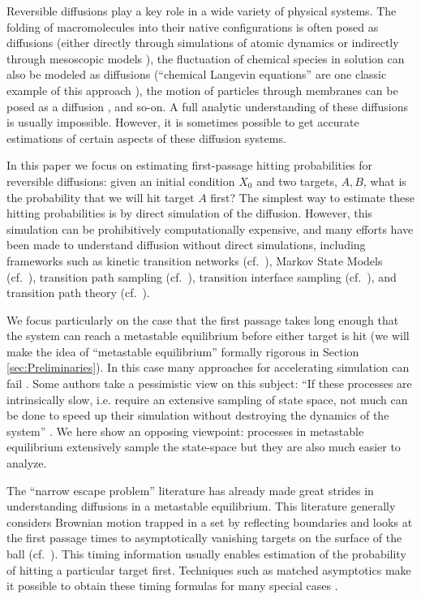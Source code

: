 \documentclass[12pt, nofootinbib,english, amsmath, amssymb, aps, priprint, graphicx,floatfix]{revtex4-1}
\theoremstyle{plain}
\theoremstyle{definition}
\theoremstyle{plain}
\begin{document}
Reversible diffusions play a key role in a wide variety of physical systems.  The folding of macromolecules into their native configurations is often posed as diffusions (either directly through simulations of atomic dynamics or indirectly through mesoscopic models \cite{Scheraga2007-qw,Hospital2015-ol,lei2010direct}), the fluctuation of chemical species in solution can also be modeled as diffusions (``chemical Langevin equations'' are one classic example of this approach \cite{sotiropoulos2011analytical,gillespie2000chemical}), the motion of particles through  membranes can be posed as a diffusion \cite{holcman2004escape}, and so-on.   A full analytic understanding of these diffusions is usually impossible.  However, it is sometimes possible to get accurate estimations of certain aspects of these diffusion systems.

In this paper we focus on estimating first-passage hitting probabilities for reversible diffusions: given an initial condition $X_0$ and two targets, $A,B$, what is the probability that we will hit target $A$ first?  The simplest way to estimate these hitting probabilities is by direct simulation of the diffusion.  However, this simulation can be prohibitively computationally expensive, and many efforts have been made to understand diffusion without direct simulations, including frameworks such as kinetic transition networks (cf.\ \cite{Noe2006-cs, Wales2006-ur}), Markov State Models (cf.\ \cite{Pande2010-yi, Chodera2014-bh, Husic2018-xp}), transition path sampling (cf.\ \cite{Dellago1998-lb, Bolhuis2002-ws}), transition interface sampling (cf.\ \cite{Van_Erp2005-vw}), and transition path theory (cf.\ \cite{E2006-fm, E2010-sr}).  

We focus particularly on the case that the first passage takes long enough that the system can reach a metastable equilibrium before either target is hit (we will make the idea of ``metastable equilibrium'' formally rigorous in Section \ref{sec:Preliminaries}).  In this case many approaches for accelerating simulation can fail \cite{Baum1986-we, Wille1987-tf, Machta2009-gh}. Some authors take a pessimistic view on this subject: ``If these processes are intrinsically slow, i.e. require an extensive sampling of state space, not much can be done to speed up their simulation without destroying the dynamics of the system'' \cite{Christen2008-ge}.  We here show an opposing viewpoint: processes in metastable equilibrium extensively sample the state-space but they are also much easier to analyze. 

The ``narrow escape problem'' literature has already made great strides in understanding diffusions in a metastable equilibrium.  This literature generally considers Brownian motion trapped in a set by reflecting boundaries and looks at the first passage times to asymptotically vanishing targets on the surface of the ball (cf.\ \cite{holcman2004escape,cheviakov2010asymptotic}).   This timing information usually enables estimation of the probability of hitting a particular target first.  Techniques such as matched asymptotics make it possible to obtain these timing formulas for many special cases \cite{cheviakov2010asymptotic}.  
\end{document}
